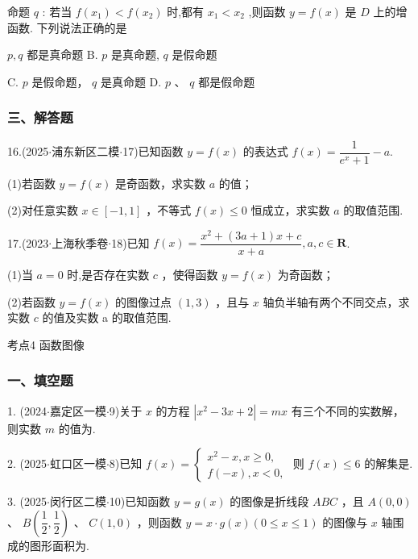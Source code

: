 命题 $q$ : 若当 $f\left( {x}_{1}\right)  < f\left( {x}_{2}\right)$ 时,都有 ${x}_{1} < {x}_{2}$ ,则函数 $y = f\left( x\right)$ 是 $D$ 上的增函数. 下列说法正确的是 \dotfill{(\kh{})}

\xx{}{}{}{}$p,q$ 都是真命题 B. $p$ 是真命题, $q$ 是假命题

C. $p$ 是假命题， $q$ 是真命题 D. $p$ 、 $q$ 都是假命题

\subsubsection*{三、解答题}

16.(2025$\cdot$浦东新区二模$\cdot$17)已知函数 $y = f\left( x\right)$ 的表达式 $f\left( x\right)  = \dfrac{1}{{{e}}^{x} + 1} - a$.

(1)若函数 $y = f\left( x\right)$ 是奇函数，求实数 $a$ 的值；

(2)对任意实数 $x \in  \left\lbrack  {-1,1}\right\rbrack$ ，不等式 $f\left( x\right)  \leq  0$ 恒成立，求实数 $a$ 的取值范围.

17.(2023$\cdot$上海秋季卷$\cdot$18)已知 $f\left( x\right)  = \dfrac{{x}^{2} + \left( {{3a} + 1}\right) x + c}{x + a},a,c \in  \mathbf{R}$.

(1)当 $a = 0$ 时,是否存在实数 $c$ ，使得函数 $y = f\left( x\right)$ 为奇函数；

(2)若函数 $y = f\left( x\right)$ 的图像过点 $\left( {1,3}\right)$ ，且与 $x$ 轴负半轴有两个不同交点，求实数 $c$ 的值及实数 a 的取值范围.

考点4 函数图像

\subsubsection*{一、填空题}

1. (2024$\cdot$嘉定区一模$\cdot$9)关于 $x$ 的方程 $\left| {{x}^{2} - {3x} + 2}\right|  = {mx}$ 有三个不同的实数解，则实数 $m$ 的值为\blkda[2]{}.

2. (2025$\cdot$虹口区一模$\cdot$8)已知 $f\left( x\right)  = \left\{  \begin{array}{l} {x}^{2} - x,x \geq  0, \\  f\left( {-x}\right) ,x < 0, \end{array}\right.$ 则 $f\left( x\right)  \leq  6$ 的解集是\blkda[2]{}.

3. (2025$\cdot$闵行区二模$\cdot$10)已知函数 $y = g\left( x\right)$ 的图像是折线段 ${ABC}$ ，且 $A\left( {0,0}\right)$ 、 $B\left( {\dfrac{1}{2},\dfrac{1}{2}}\right)$ 、 $C\left( {1,0}\right)$ ，则函数 $y = x \cdot  g\left( x\right) \left( {0 \leq  x \leq  1}\right)$ 的图像与 $x$ 轴围成的图形面积为\blkda[2]{}.

